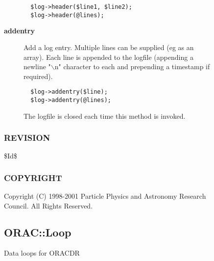 \begin{description}
\begin{description}
\begin{description}
\begin{verbatim}
  $log->header($line1, $line2);
  $log->header(@lines);
\end{verbatim}

\item[{\textbf{addentry}}] \mbox{}

Add a log entry. Multiple lines can be supplied (eg as an array).
Each line is appended to the logfile (appending a newline "$\backslash$n"
character to each and prepending a timestamp if required).

\begin{verbatim}
  $log->addentry($line);
  $log->addentry(@lines);
\end{verbatim}


The logfile is closed each time this method is invoked.

\end{description}
\subsubsection*{REVISION\label{ORAC::LogFile_REVISION}}


\$Id\$

\subsubsection*{COPYRIGHT\label{ORAC::LogFile_COPYRIGHT}}


Copyright (C) 1998-2001 Particle Physics and Astronomy Research
Council. All Rights Reserved.

\subsection{ORAC::Loop\label{ORAC::Loop}}


Data loops for ORACDR


\end{description}
\end{description}
